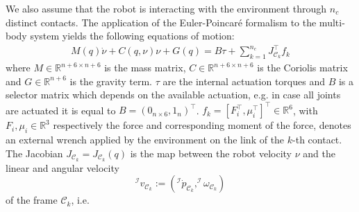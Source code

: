 
We also assume that the robot is interacting with the environment through $n_c$ distinct contacts. 
The application of the Euler-Poincar\'e formalism \cite[Ch. 13.5]{Marsden2010}
to the multi-body system  yields the following equations of motion: 
\begin{align}
    \label{eq:system_dynamics}
       {M}(q)\dot{{\nu}} + {C}(q, {\nu}) {\nu} + {G}(q) =  B \tau + \sum_{k = 1}^{n_c} {J}^\top_{\mathcal{C}_k} f_k
\end{align}
where ${M} \in \mathbb{R}^{n+6 \times n+6}$ is the mass matrix, ${C} \in \mathbb{R}^{n+6 \times n+6}$ is the Coriolis matrix and ${G} \in \mathbb{R}^{n+6}$ is the gravity term.
$\tau$ are the internal actuation torques and $B$ is a selector matrix which depends on the available actuation, e.g. in case all joints are actuated it is equal to $B = (0_{n\times 6} , 1_n)^\top$.
$f_k = [F_i^\top, \mu_i^\top]^\top \in \mathbb{R}^6$, with $F_i, \mu_i \in \mathbb{R}^3$ respectively the force and corresponding moment of the force, denotes an external wrench applied by the environment on the link of the $k$-th contact.
The Jacobian ${J}_{\mathcal{C}_k}= {J}_{\mathcal{C}_k}(q)$ is the map between the robot velocity ${\nu}$ and the linear and angular velocity \[ ^\mathcal{I}v_{\mathcal{C}_k} := (^\mathcal{I}\dot{ p}_{\mathcal{C}_k},^\mathcal{I}\omega_{\mathcal{C}_k})\] of the frame $\mathcal{C}_k$, i.e.
